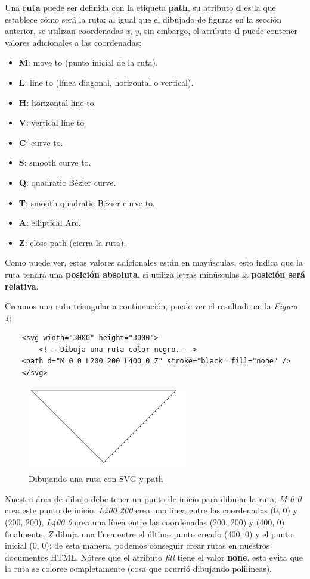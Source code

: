 Una \textbf{ruta} puede ser definida con la etiqueta \textbf{path}, su atributo \textbf{d} es la que establece cómo será la ruta; al igual que el dibujado de figuras en la sección anterior, se utilizan coordenadas \textit{x}, \textit{y}, sin embargo, el atributo \textbf{d} puede contener valores adicionales a las coordenadas:
\begin{itemize}
    \item \textbf{M}: move to (punto inicial de la ruta).
    \item \textbf{L}: line to (línea diagonal, horizontal o vertical).
    \item \textbf{H}: horizontal line to.
    \item \textbf{V}: vertical line to
    \item \textbf{C}: curve to.
    \item \textbf{S}: smooth curve to.
    \item \textbf{Q}: quadratic Bézier curve.
    \item \textbf{T}: smooth quadratic Bézier curve to.
    \item \textbf{A}: elliptical Arc.
    \item \textbf{Z}: close path (cierra la ruta).
\end{itemize}

Como puede ver, estos valores adicionales están en mayúsculas, esto indica que la ruta tendrá una \textbf{posición absoluta}, si utiliza letras minúsculas la \textbf{posición será relativa}.

Creamos una ruta triangular a continuación, puede ver el resultado en la \textit{Figura \ref{fig: 26}}:
\begin{lstlisting}
    <svg width="3000" height="3000">
        <!-- Dibuja una ruta color negro. -->
   	<path d="M 0 0 L200 200 L400 0 Z" stroke="black" fill="none" />
    </svg>
\end{lstlisting}
\begin{figure}[H]
    \centering
    \caption{Dibujando una ruta con SVG y path}
    \label{fig: 26}
    \includegraphics[width=7cm]{ss_html/svg_path.png}
\end{figure}

Nuestra área de dibujo debe tener un punto de inicio para dibujar la ruta, \textit{M 0 0} crea este punto de inicio, \textit{L200 200} crea una línea entre las coordenadas (0, 0) y (200, 200), \textit{L400 0} crea una línea entre las coordenadas (200, 200) y (400, 0), finalmente, \textit{Z} dibuja una línea entre el último punto creado (400, 0) y el punto inicial (0, 0); de esta manera, podemos conseguir crear rutas en nuestros documentos HTML. Nótese que el atributo \textit{fill} tiene el valor \textbf{none}, esto evita que la ruta se coloree completamente (cosa que ocurrió dibujando polilíneas).